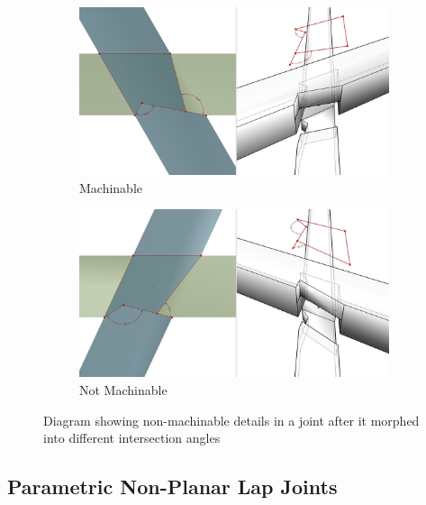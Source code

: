 \begin{figure}[!h]
    \centering
    \begin{subfigure}[b]{0.49\textwidth}
        \centering
        \includegraphics[width=\textwidth]{images/7a/img15.jpg}
        \caption{Machinable}
        \label{fig:joint-machinable}
    \end{subfigure}
    \hfill
    \begin{subfigure}[b]{0.49\textwidth}
        \centering
        \includegraphics[width=\textwidth]{images/7a/img16.jpg}
        \caption{Not Machinable}
        \label{fig:joint-not-machinable}
    \end{subfigure}
    \caption{Diagram showing non-machinable details in a joint after it morphed into different intersection angles}
    \label{fig:non-machinable-details-in-a-joint}
\end{figure}

\FloatBarrier

\subsection{Parametric Non-Planar Lap Joints}
\label{subsection:exploration-4-parametric-non-planar-lap-joints}

